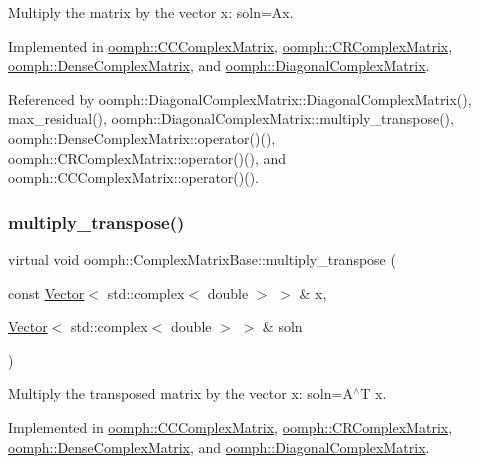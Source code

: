 Multiply the matrix by the vector x\+: soln=Ax. 



Implemented in \hyperlink{classoomph_1_1CCComplexMatrix_a6c7ba50bf29c2e9f40a68a073534f261}{oomph\+::\+C\+C\+Complex\+Matrix}, \hyperlink{classoomph_1_1CRComplexMatrix_a5ebf5f24c1bd1b4e4e3df6ebcceb189e}{oomph\+::\+C\+R\+Complex\+Matrix}, \hyperlink{classoomph_1_1DenseComplexMatrix_afcc47dd450a1ab37d2790b5d0279cadf}{oomph\+::\+Dense\+Complex\+Matrix}, and \hyperlink{classoomph_1_1DiagonalComplexMatrix_a8e7b0ca4ea51eb40fa9fe4fd8e9ba99c}{oomph\+::\+Diagonal\+Complex\+Matrix}.



Referenced by oomph\+::\+Diagonal\+Complex\+Matrix\+::\+Diagonal\+Complex\+Matrix(), max\+\_\+residual(), oomph\+::\+Diagonal\+Complex\+Matrix\+::multiply\+\_\+transpose(), oomph\+::\+Dense\+Complex\+Matrix\+::operator()(), oomph\+::\+C\+R\+Complex\+Matrix\+::operator()(), and oomph\+::\+C\+C\+Complex\+Matrix\+::operator()().

\mbox{\label{classoomph_1_1ComplexMatrixBase_a90c7832bad84aad3d0f437925efb089a}} 
\subsubsection{\texorpdfstring{multiply\+\_\+transpose()}{multiply\_transpose()}}
{\footnotesize\ttfamily virtual void oomph\+::\+Complex\+Matrix\+Base\+::multiply\+\_\+transpose (\begin{DoxyParamCaption}\item[{const \hyperlink{classoomph_1_1Vector}{Vector}$<$ std\+::complex$<$ double $>$ $>$ \&}]{x,  }\item[{\hyperlink{classoomph_1_1Vector}{Vector}$<$ std\+::complex$<$ double $>$ $>$ \&}]{soln }\end{DoxyParamCaption})\hspace{0.3cm}{\ttfamily [pure virtual]}}



Multiply the transposed matrix by the vector x\+: soln=A$^\wedge$T x. 



Implemented in \hyperlink{classoomph_1_1CCComplexMatrix_a85c89a6e460b6eb0a1ab704b6272c4d7}{oomph\+::\+C\+C\+Complex\+Matrix}, \hyperlink{classoomph_1_1CRComplexMatrix_a5df8a8b3bb15ce5627e7300448b13d28}{oomph\+::\+C\+R\+Complex\+Matrix}, \hyperlink{classoomph_1_1DenseComplexMatrix_aaaf8f0589e011bf720791058711fa952}{oomph\+::\+Dense\+Complex\+Matrix}, and \hyperlink{classoomph_1_1DiagonalComplexMatrix_a1de87dc3b52ecb737d15893860c5844b}{oomph\+::\+Diagonal\+Complex\+Matrix}.



